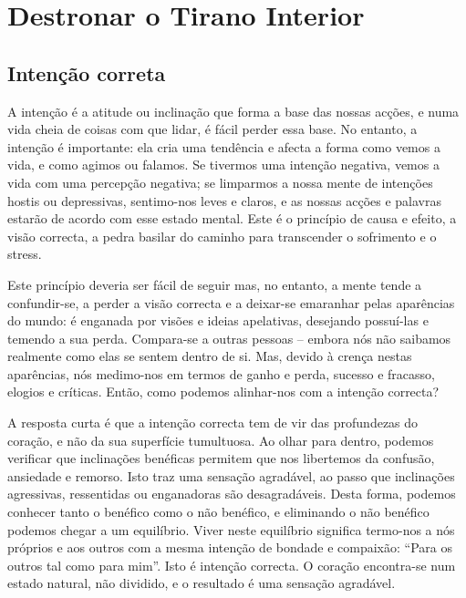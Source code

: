 \chapter{Destronar o Tirano Interior}

\section{Intenção correta}

A intenção é a atitude ou inclinação que forma a base das nossas acções,
e numa vida cheia de coisas com que lidar, é fácil perder essa base. No
entanto, a intenção é importante: ela cria uma tendência e afecta a
forma como vemos a vida, e como agimos ou falamos. Se tivermos uma
intenção negativa, vemos a vida com uma percepção negativa; se limparmos
a nossa mente de intenções hostis ou depressivas, sentimo-nos leves e
claros, e as nossas acções e palavras estarão de acordo com esse estado
mental. Este é o princípio de causa e efeito, a visão correcta, a pedra
basilar do caminho para transcender o sofrimento e o stress.

Este princípio deveria ser fácil de seguir mas, no entanto, a mente
tende a confundir-se, a perder a visão correcta e a deixar-se emaranhar
pelas aparências do mundo: é enganada por visões e ideias apelativas,
desejando possuí-las e temendo a sua perda. Compara-se a outras pessoas
-- embora nós não saibamos realmente como elas se sentem dentro de si.
Mas, devido à crença nestas aparências, nós medimo-nos em termos de
ganho e perda, sucesso e fracasso, elogios e críticas. Então, como
podemos alinhar-nos com a intenção correcta?

\sectionBreak

A resposta curta é que a intenção correcta tem de vir das profundezas do
coração, e não da sua superfície tumultuosa. Ao olhar para dentro,
podemos verificar que inclinações benéficas permitem que nos libertemos
da confusão, ansiedade e remorso. Isto traz uma sensação agradável, ao
passo que inclinações agressivas, ressentidas ou enganadoras são
desagradáveis. Desta forma, podemos conhecer tanto o benéfico como o não
benéfico, e eliminando o não benéfico podemos chegar a um equilíbrio.
Viver neste equilíbrio significa termo-nos a nós próprios e aos outros
com a mesma intenção de bondade e compaixão: “Para os outros tal como
para mim”. Isto é intenção correcta. O coração encontra-se num estado
natural, não dividido, e o resultado é uma sensação agradável.

